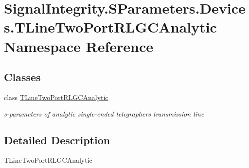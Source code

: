 \hypertarget{namespaceSignalIntegrity_1_1SParameters_1_1Devices_1_1TLineTwoPortRLGCAnalytic}{}\section{Signal\+Integrity.\+S\+Parameters.\+Devices.\+T\+Line\+Two\+Port\+R\+L\+G\+C\+Analytic Namespace Reference}
\label{namespaceSignalIntegrity_1_1SParameters_1_1Devices_1_1TLineTwoPortRLGCAnalytic}
\subsection*{Classes}
\begin{DoxyCompactItemize}
\item 
class \hyperlink{classSignalIntegrity_1_1SParameters_1_1Devices_1_1TLineTwoPortRLGCAnalytic_1_1TLineTwoPortRLGCAnalytic}{T\+Line\+Two\+Port\+R\+L\+G\+C\+Analytic}
\begin{DoxyCompactList}\small\item\em s-\/parameters of analytic single-\/ended telegraphers transmission line \end{DoxyCompactList}\end{DoxyCompactItemize}


\subsection{Detailed Description}
\begin{DoxyVerb}TLineTwoPortRLGCAnalytic\end{DoxyVerb}
 